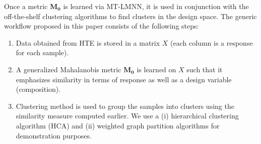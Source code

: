 Once a metric \(\mathbf{M_0}\) is learned via MT-LMNN, it is used in conjunction with the off-the-shelf clustering algorithms to find clusters in the design space. The generic workflow proposed in this paper consists of the following steps: 
\begin{enumerate}
\item Data obtained from HTE is stored in a matrix $X$ (each column is a response for each sample).
\item A generalized Mahalanobis metric \(\mathbf{M_0}\) is learned on $X$ such that it emphasizes similarity in terms of response as well as a design variable (composition).
\item Clustering method is used to group the samples into clusters using the similarity measure computed earlier. We use a (i) hierarchical clustering algorithm (HCA) and (ii) weighted graph partition algorithms for demonstration purposes. 
\end{enumerate}
